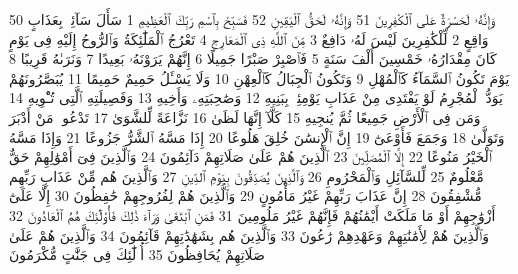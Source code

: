 {\tiny\colorbox{cl_aya}{50}} وَإِنَّهُۥ لَحَسْرَةٌ عَلَى ٱلْكَٰفِرِينَ
{\tiny\colorbox{cl_aya}{51}} وَإِنَّهُۥ لَحَقُّ ٱلْيَقِينِ
{\tiny\colorbox{cl_aya}{52}} فَسَبِّحْ بِٱسْمِ رَبِّكَ ٱلْعَظِيمِ
{\tiny\colorbox{cl_aya}{1}} سَأَلَ سَآئِلٌۢ بِعَذَابٍ وَاقِعٍ
{\tiny\colorbox{cl_aya}{2}} لِّلْكَٰفِرِينَ لَيْسَ لَهُۥ دَافِعٌ
{\tiny\colorbox{cl_aya}{3}} مِّنَ ٱللَّهِ ذِى ٱلْمَعَارِجِ
{\tiny\colorbox{cl_aya}{4}} تَعْرُجُ ٱلْمَلَٰٓئِكَةُ وَٱلرُّوحُ إِلَيْهِ فِى يَوْمٍ كَانَ مِقْدَارُهُۥ خَمْسِينَ أَلْفَ سَنَةٍ
{\tiny\colorbox{cl_aya}{5}} فَٱصْبِرْ صَبْرًا جَمِيلًا
{\tiny\colorbox{cl_aya}{6}} إِنَّهُمْ يَرَوْنَهُۥ بَعِيدًا
{\tiny\colorbox{cl_aya}{7}} وَنَرَىٰهُ قَرِيبًا
{\tiny\colorbox{cl_aya}{8}} يَوْمَ تَكُونُ ٱلسَّمَآءُ كَٱلْمُهْلِ
{\tiny\colorbox{cl_aya}{9}} وَتَكُونُ ٱلْجِبَالُ كَٱلْعِهْنِ
{\tiny\colorbox{cl_aya}{10}} وَلَا يَسْـَٔلُ حَمِيمٌ حَمِيمًا
{\tiny\colorbox{cl_aya}{11}} يُبَصَّرُونَهُمْ يَوَدُّ ٱلْمُجْرِمُ لَوْ يَفْتَدِى مِنْ عَذَابِ يَوْمِئِذٍۭ بِبَنِيهِ
{\tiny\colorbox{cl_aya}{12}} وَصَٰحِبَتِهِۦ وَأَخِيهِ
{\tiny\colorbox{cl_aya}{13}} وَفَصِيلَتِهِ ٱلَّتِى تُـْٔوِيهِ
{\tiny\colorbox{cl_aya}{14}} وَمَن فِى ٱلْأَرْضِ جَمِيعًا ثُمَّ يُنجِيهِ
{\tiny\colorbox{cl_aya}{15}} كَلَّآ إِنَّهَا لَظَىٰ
{\tiny\colorbox{cl_aya}{16}} نَزَّاعَةً لِّلشَّوَىٰ
{\tiny\colorbox{cl_aya}{17}} تَدْعُوا۟ مَنْ أَدْبَرَ وَتَوَلَّىٰ
{\tiny\colorbox{cl_aya}{18}} وَجَمَعَ فَأَوْعَىٰٓ
{\tiny\colorbox{cl_aya}{19}} إِنَّ ٱلْإِنسَٰنَ خُلِقَ هَلُوعًا
{\tiny\colorbox{cl_aya}{20}} إِذَا مَسَّهُ ٱلشَّرُّ جَزُوعًا
{\tiny\colorbox{cl_aya}{21}} وَإِذَا مَسَّهُ ٱلْخَيْرُ مَنُوعًا
{\tiny\colorbox{cl_aya}{22}} إِلَّا ٱلْمُصَلِّينَ
{\tiny\colorbox{cl_aya}{23}} ٱلَّذِينَ هُمْ عَلَىٰ صَلَاتِهِمْ دَآئِمُونَ
{\tiny\colorbox{cl_aya}{24}} وَٱلَّذِينَ فِىٓ أَمْوَٰلِهِمْ حَقٌّ مَّعْلُومٌ
{\tiny\colorbox{cl_aya}{25}} لِّلسَّآئِلِ وَٱلْمَحْرُومِ
{\tiny\colorbox{cl_aya}{26}} وَٱلَّذِينَ يُصَدِّقُونَ بِيَوْمِ ٱلدِّينِ
{\tiny\colorbox{cl_aya}{27}} وَٱلَّذِينَ هُم مِّنْ عَذَابِ رَبِّهِم مُّشْفِقُونَ
{\tiny\colorbox{cl_aya}{28}} إِنَّ عَذَابَ رَبِّهِمْ غَيْرُ مَأْمُونٍ
{\tiny\colorbox{cl_aya}{29}} وَٱلَّذِينَ هُمْ لِفُرُوجِهِمْ حَٰفِظُونَ
{\tiny\colorbox{cl_aya}{30}} إِلَّا عَلَىٰٓ أَزْوَٰجِهِمْ أَوْ مَا مَلَكَتْ أَيْمَٰنُهُمْ فَإِنَّهُمْ غَيْرُ مَلُومِينَ
{\tiny\colorbox{cl_aya}{31}} فَمَنِ ٱبْتَغَىٰ وَرَآءَ ذَٰلِكَ فَأُو۟لَٰٓئِكَ هُمُ ٱلْعَادُونَ
{\tiny\colorbox{cl_aya}{32}} وَٱلَّذِينَ هُمْ لِأَمَٰنَٰتِهِمْ وَعَهْدِهِمْ رَٰعُونَ
{\tiny\colorbox{cl_aya}{33}} وَٱلَّذِينَ هُم بِشَهَٰدَٰتِهِمْ قَآئِمُونَ
{\tiny\colorbox{cl_aya}{34}} وَٱلَّذِينَ هُمْ عَلَىٰ صَلَاتِهِمْ يُحَافِظُونَ
{\tiny\colorbox{cl_aya}{35}} أُو۟لَٰٓئِكَ فِى جَنَّٰتٍ مُّكْرَمُونَ
